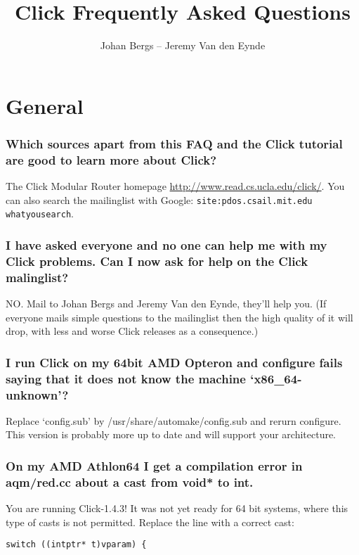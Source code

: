 \documentclass[a4paper]{article}
\author{Johan Bergs -- Jeremy Van den Eynde}
\title{Click Frequently Asked Questions}
\date{}
\begin{document}
\maketitle
\tableofcontents

\section{General} %
\label{sec:general}

\subsubsection*{Which sources apart from this FAQ and the Click tutorial are good to learn more about Click?} %
The Click Modular Router homepage \url{http://www.read.cs.ucla.edu/click/}. You can  also search the mailinglist with Google: \texttt{site:pdos.csail.mit.edu whatyousearch}.


\subsubsection*{I have asked everyone and no one can help me with my Click problems. Can
I now ask for help on the Click malinglist?}

NO. Mail to Johan Bergs and Jeremy Van den Eynde, they'll
help you. (If everyone mails simple questions to the mailinglist then
the high quality of it will drop, with less and worse Click releases as
a consequence.)

\subsubsection*{I run Click on my 64bit AMD Opteron and configure fails saying that it
does not know the machine `x86\_64-unknown'?}

Replace `config.sub' by /usr/share/automake/config.sub and rerurn
configure. This version is probably more up to date and will support
your architecture.

\subsubsection*{On my AMD Athlon64 I get a compilation error in aqm/red.cc about a cast
from void* to int.}

You are running Click-1.4.3! It was not yet ready for 64 bit systems,
where this type of casts is not permitted. Replace the line with a
correct cast:
\begin{lstlisting}
switch ((intptr* t)vparam) {
\end{lstlisting}
\end{document}
